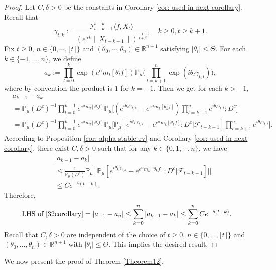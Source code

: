\documentclass[12pt,a4paper]{amsart}
\theoremstyle{plain}
\theoremstyle{definition}
\numberwithin{equation}{section}
\begin{document}
\begin{proof}
	Let $C,\delta > 0$ be the constants in Corollary \ref{cor: used in next corollary}.
    Recall that \[\gamma_{t,k}:=\frac {\mathcal I_{t-k-1}^{t-k}\langle f ,X_t\rangle}{(e^{\alpha k}\|X_{t-k-1}\|)^\frac{1}{1+\beta}},\quad k \geq 0, t\geq k+1. \]
        Fix $t\geq 0$, $n \in \{0, \cdots, \lfloor t \rfloor\}$ and $(\theta_0, \cdots, \theta_n)\in \mathbb R^{n+1}$
    satisfying $|\theta_i|\leq \Theta$.
    For each $k\in\{-1,...,n\}$, we define
    \[a_k:=\prod_{l=0}^{k}\exp(e^{\alpha}m_l[\theta_lf])\mathbb{\tilde{P}}_{\mu}\Big(\prod_{l=k+1}^{n}\exp\left(i\theta_l\gamma_{t,l}\right)\Big),\]
     where by convention the product is $1$ for $k=-1$. Then we get for each $k > -1$,
    \begin{align*}
        &a_{k-1} - a_k
        \\&=\mathbb{P}_{\mu}(D^c)^{-1}\prod_{l=0}^{k-1}e^{e^{\alpha}m_l[\theta_l f]}\mathbb{P}_{\mu}\Big[(e^{i\theta_{k}\gamma_{t,k}}-e^{e^{\alpha}m_k[\theta_k f]})\prod_{l=k+1}^ne^{i\theta_{l}\gamma_{t,l}};D^c\Big]
        \\&=\mathbb{P}_{\mu}(D^c)^{-1}\prod_{l=0}^{k-1}e^{e^{\alpha}m_l[\theta_l f]}\mathbb{P}_{\mu}\Big[\mathbb P_\mu[e^{i\theta_{k}\gamma_{t,k}}-e^{e^{\alpha}m_k[\theta_k f]}; D^c|\mathscr F_{t-k-1}]\prod_{l=k+1}^ne^{i\theta_{l}\gamma_{t,l}}\Big].
    \end{align*}
  According to Proposition \ref{cor: alpha stable rv} and Corollary \ref{cor: used in next corollary},
    there exist $C,\delta>0$ such that for any
        $k\in\{0, 1, \cdots, n\}$, we have
    \begin{align*}
        &|a_{k-1}- a_k|
        \\&\leq \frac{1}{\mathbb{P}_{\mu}(D^c)}\mathbb{P}_{\mu}\Big[\big|\mathbb P_\mu[e^{i\theta_{k}\gamma_{t,k}}-e^{e^{\alpha}m_k[\theta_k f]}; D^c\big|\mathscr{F}_{t-k-1}]\big|\Big]
        \\& \leq C e^{-\delta(t-k)}.
    \end{align*}
Therefore,
\begin{equation}\begin{split}
    \text{LHS of \eqref{32corollary}}&= \left|a_{-1}-a_n\right|
    \leq\sum_{k=0}^n\left|a_{k-1}-a_k\right|
    \leq \sum_{k=0}^n C e^{-\delta(t-k)}.
\end{split}\end{equation}
	Recall that $C, \delta>0$ are independent of the choice of $t\geq 0$, $n \in \{0,...,\lfloor t \rfloor\}$ and $(\theta_0,...,\theta_n)\in \mathbb R^{n+1}$ with $|\theta_i|\leq \Theta$.
    This implies the desired result.
\end{proof}
We now present the proof of Theorem \ref{Theorem12}.
\bigskip
\end{document}
